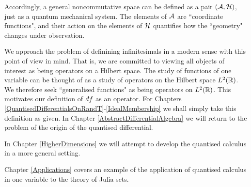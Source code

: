 Accordingly, a general noncommutative space can be defined
as a pair $(\mathcal{A},\mathcal{H})$, just as a quantum mechanical system.
The elements of $\mathcal{A}$ are ``coordinate functions", and their
action on the elements of $\mathcal{H}$ quantifies how the ``geometry"
changes under observation.

We approach the problem of definining
infinitesimals in a modern sense with this point of view in mind.
That is, we are committed to viewing all objects of interest as being operators
on a Hilbert space. The study of functions of one variable can be thought
of as a study of operators on the Hilbert space $L^2(\mathbb{R})$. We therefore
seek ``generalised functions" as being operators on $L^2(\mathbb{R})$. This motivates
our definition of $\qd f$ as an operator. For Chapters \ref{QuantisedDifferentialsOnRandT}-\ref{IdealMembership} we shall simply take this definition as given. In Chapter \ref{AbstractDifferentialAlgebra}
we will return to the problem of the origin of the quantised differential.

In Chapter \ref{HigherDimensions} we will attempt to develop the quantised calculus
in a more general setting.

Chapter \ref{Applications} covers an example of the application of quantised
calculus in one variable to the theory of Julia sets.

